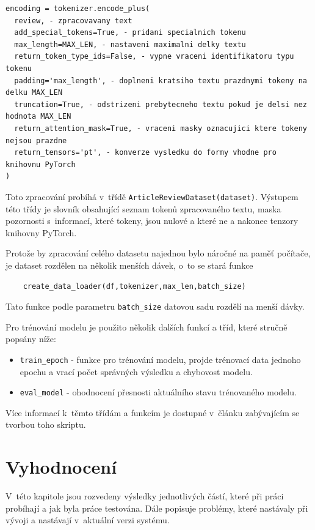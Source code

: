 \begin{lstlisting}[basicstyle=\small]
encoding = tokenizer.encode_plus(
  review, - zpracovavany text
  add_special_tokens=True, - pridani specialnich tokenu
  max_length=MAX_LEN, - nastaveni maximalni delky textu 
  return_token_type_ids=False, - vypne vraceni identifikatoru typu tokenu
  padding='max_length', - doplneni kratsiho textu prazdnymi tokeny na delku MAX_LEN 
  truncation=True, - odstrizeni prebytecneho textu pokud je delsi nez hodnota MAX_LEN
  return_attention_mask=True, - vraceni masky oznacujici ktere tokeny nejsou prazdne
  return_tensors='pt', - konverze vysledku do formy vhodne pro knihovnu PyTorch
)
\end{lstlisting}
Toto zpracování probíhá v~třídě \verb|ArticleReviewDataset(dataset)|. Výstupem této třídy je slovník obsahující seznam tokenů zpracovaného textu, maska pozornosti s~informací, které tokeny, jsou nulové a které ne a nakonec tenzory knihovny PyTorch.

Protože by zpracování celého datasetu najednou bylo náročné na paměť počítače, je dataset rozdělen na několik menších dávek, o~to se stará funkce 

\begin{lstlisting}
    create_data_loader(df,tokenizer,max_len,batch_size)
\end{lstlisting}

Tato funkce podle parametru \verb|batch_size| datovou sadu rozdělí na menší dávky.

Pro trénování modelu je použito několik dalších funkcí a tříd, které stručně popsány níže:
\begin{itemize}
    \item \verb|train_epoch| - funkce pro trénování modelu, projde trénovací data jednoho epochu a vrací počet správných výsledku a chybovost modelu.
    \item \verb|eval_model| - ohodnocení přesnosti aktuálního stavu trénovaného modelu.
\end{itemize}
Více informací k~těmto třídám a funkcím je dostupné v~článku zabývajícím se tvorbou toho skriptu\cite{valkov_2020}.


\chapter{Vyhodnocení}
\label{vyhodnoceni}

V~této kapitole jsou rozvedeny výsledky jednotlivých částí, které při práci probíhají a jak byla práce testována. Dále popisuje problémy, které nastávaly při vývoji a nastávají v~aktuální verzi systému.

